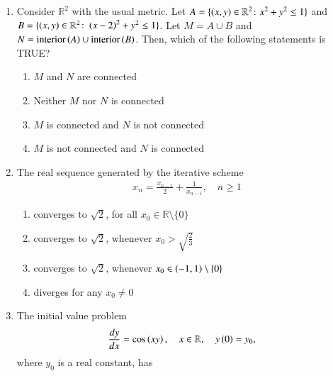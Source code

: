 \documentclass[journal,12pt,onecolumn]{IEEEtran}
\theoremstyle{remark}
\begin{document}
\begin{enumerate}
\hfill{}

\begin{enumerate}
\end{enumerate}



\newpage
\item Consider $\mathbb{R}^{2}$ with the usual metric. Let
$A=\{\left(x,y\right)\in \mathbb{R}^{2}\colon x^{2}+y^{2}\le 1\}$ and
$B=\{\left(x,y\right)\in \mathbb{R}^{2}\colon \left(x-2\right)^{2}+y^{2}\le 1\}$.
Let $M=A\cup B$ and $N=\operatorname{interior}\left(A\right)\cup \operatorname{interior}\left(B\right)$.
Then, which of the following statements is TRUE?

\hfill{}

\begin{enumerate}
\item $M$ and $N$ are connected
\item Neither $M$ nor $N$ is connected
\item $M$ is connected and $N$ is not connected
\item $M$ is not connected and $N$ is connected
\end{enumerate}


\item The real sequence generated by the iterative scheme
\begin{align*}
x_{n} = \frac{x_{n-1}}{2} + \frac{1}{x_{n-1}}, \quad n \ge 1
\end{align*}

\hfill{}

\begin{enumerate}
\item converges to $\sqrt{2}$, for all $x_{0} \in \mathbb{R} \setminus \{0\}$
\item converges to $\sqrt{2}$, whenever $x_{0} > \sqrt{\tfrac{2}{3}}$
\item converges to $\sqrt{2}$, whenever $x_{0} \in \left(-1, 1\right) \setminus \{0\}$
\item diverges for any $x_{0} \ne 0$
\end{enumerate}

\item The initial value problem
\begin{align*}
\frac{dy}{dx} &= \cos\left(xy\right), \quad x \in \mathbb{R}, \quad y\left(0\right) = y_0,
\end{align*}
where $y_0$ is a real constant, has


\end{enumerate}
\end{document}
